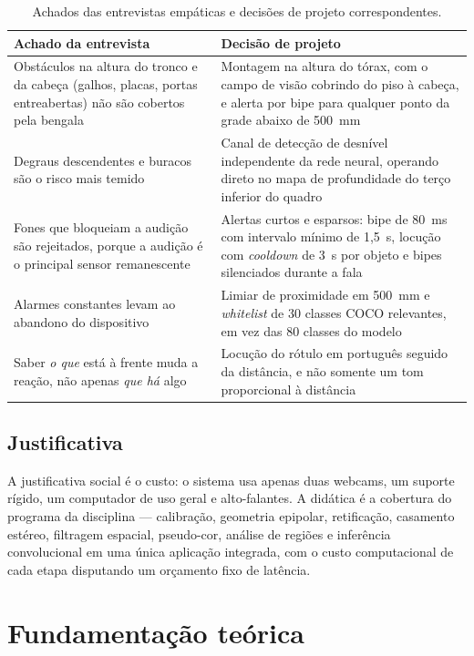 \documentclass[12pt]{article}
\begin{document}
\begin{table}[ht]
\centering
\caption{Achados das entrevistas empáticas e decisões de projeto correspondentes.}
\label{quadro1}
\footnotesize
\begin{tabular}{p{6.0cm}p{6.5cm}}
\toprule
\textbf{Achado da entrevista} & \textbf{Decisão de projeto} \\
\midrule
Obstáculos na altura do tronco e da cabeça (galhos, placas, portas
entreabertas) não são cobertos pela bengala &
Montagem na altura do tórax, com o campo de visão cobrindo do piso à cabeça,
e alerta por bipe para qualquer ponto da grade abaixo de 500~mm \\
\addlinespace
Degraus descendentes e buracos são o risco mais temido &
Canal de detecção de desnível independente da rede neural, operando direto no
mapa de profundidade do terço inferior do quadro \\
\addlinespace
Fones que bloqueiam a audição são rejeitados, porque a audição é o principal
sensor remanescente &
Alertas curtos e esparsos: bipe de 80~ms com intervalo mínimo de 1,5~s,
locução com \textit{cooldown} de 3~s por objeto e bipes silenciados durante a
fala \\
\addlinespace
Alarmes constantes levam ao abandono do dispositivo &
Limiar de proximidade em 500~mm e \textit{whitelist} de 30 classes COCO
relevantes, em vez das 80 classes do modelo \\
\addlinespace
Saber \emph{o que} está à frente muda a reação, não apenas \emph{que há} algo &
Locução do rótulo em português seguido da distância, e não somente um tom
proporcional à distância \\
\bottomrule
\end{tabular}
\end{table}

\subsection{Justificativa}

A justificativa social é o custo: o sistema usa apenas duas webcams, um
suporte rígido, um computador de uso geral e alto-falantes. A didática é a
cobertura do programa da disciplina --- calibração, geometria epipolar,
retificação, casamento estéreo, filtragem espacial, pseudo-cor, análise de
regiões e inferência convolucional em uma única aplicação integrada, com o
custo computacional de cada etapa disputando um orçamento fixo de latência.

\section{Fundamentação teórica}
\end{document}
